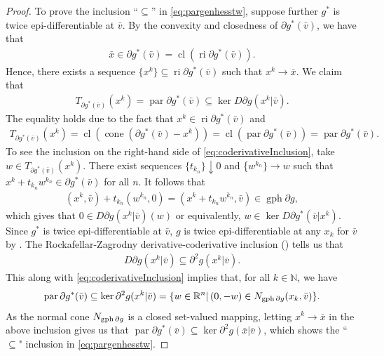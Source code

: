 \documentclass[reqno]{amsart}
\numberwithin{equation}{section}
\newcommand{\R}{\mathbb{R}}
\newcommand{\x}{\bar{x}}
\begin{document}
\begin{proof}
    To prove the inclusion ``$\subseteq$''  in \eqref{eq:pargenhesstw}, suppose further $g^*$ is  twice  epi-differentiable
    at $\bar{v}$.    By the convexity and closedness of $\partial g^* (\bar{v})$, we have that \cite[Theorem~6.3]{R 70}
    \begin{align*}
        \bar{x} \in \partial g^* (\bar{v}) = \operatorname{cl}(\operatorname{ri} \partial g^* (\bar{v})).
    \end{align*}
    Hence, there exists a sequence $\{x^k\} \subseteq \operatorname{ri} \partial g^*(\bar{v})$ such that $x^k \to \bar{x}$.
    We claim  that 
    \begin{align}\label{eq:coderivativeInclusion}
        T_{\partial g^* (\bar{v})}(x^k) = \operatorname{par} \partial g^* (\bar{v}) \subseteq \ker D \partial g( x^k | \bar{v}).
    \end{align} 
    The equality holds due to the fact that $x^k \in \operatorname{ri} \partial g^* (\bar{v})$ and \begin{align*}
        T_{\partial g^* (\bar{v})}(x^k) = \operatorname{cl}(\operatorname{cone}(\partial g^*(\bar{v}) - x^k)) = \operatorname{cl} (\operatorname{par} \partial g^* (\bar{v})) = \operatorname{par} \partial g^* (\bar{v}).
    \end{align*} To see the inclusion on the right-hand side of \eqref{eq:coderivativeInclusion},
    take $w \in T_{\partial g^* (\bar{v})}(x^k)$. There exist sequences $\{t_{k_n}\} \downarrow 0$ and \{$w^{k_n}\} \to w$
    such that $x^k + t_{k_n} w^{k_n} \in \partial g^* (\bar{v})$ for all $n$.
    It follows that \begin{align*}
       (x^k,\bar v)+t_{k_n}(w^{k_n},0)= (x^k + t_{k_n}w^{k_n}, \bar{v}) \in \operatorname{gph} \partial g,
    \end{align*} 
    which gives that $0 \in D \partial g (x^k | \bar{v})(w)$  or equivalently, $w \in \ker D \partial g^* (\bar{v} | x^k)$. Since $g^*$ is twice epi-differentiable at $\bar v$, $g$ is twice epi-differentiable at any $x_k$ for $\bar v$ by \cite[Theorem~13.21]{RoW 98}. The Rockafellar-Zagrodny derivative-coderivative inclusion (\cite[Theorem 13.57]{RoW 98}) tells us that
    \begin{align*}
        D \partial g (x^k | \bar{v}) \subseteq \partial^2 g(x^k | \bar{v}).
    \end{align*} This along with \eqref{eq:coderivativeInclusion} implies that, for all $k\in\mathbb N$, we have 
    \begin{align*}
        \operatorname{par} \partial g^* (\bar{v}) \subseteq \ker \partial^2 g(x^k | \bar{v})=\{w\in \R^n|\, (0,-w)\in N_{{\rm gph}\, \partial g}(x_k,\bar v)\}.
    \end{align*} 
    As the normal cone $N_{{\rm gph}\, \partial g}$ is a closed set-valued mapping,
    letting $x^k \to \bar{x}$ in the above inclusion gives us that  $\operatorname{par} \partial g^* (\bar{v}) \subseteq \ker \partial^2 g(\x| \bar{v})$,
    which shows the ``$\subseteq$" inclusion in \eqref{eq:pargenhesstw}.


\end{proof}
\end{document}
